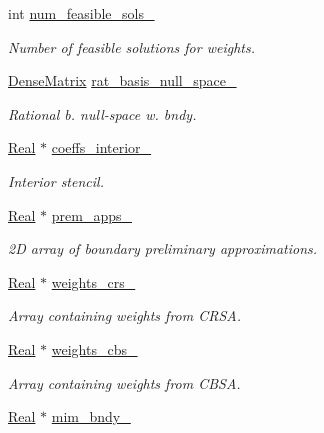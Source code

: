 \begin{DoxyCompactItemize}
int \hyperlink{classmtk_1_1Grad1D_a3561b0197c2b058bdbca39a656471299}{num\+\_\+feasible\+\_\+sols\+\_\+}
\begin{DoxyCompactList}\small\item\em Number of feasible solutions for weights. \end{DoxyCompactList}\item 
\hyperlink{classmtk_1_1DenseMatrix}{Dense\+Matrix} \hyperlink{classmtk_1_1Grad1D_a21a2941a03ae8fbf24d880660acf3db5}{rat\+\_\+basis\+\_\+null\+\_\+space\+\_\+}
\begin{DoxyCompactList}\small\item\em Rational b. null-\/space w. bndy. \end{DoxyCompactList}\item 
\hyperlink{group__c01-roots_gac080bbbf5cbb5502c9f00405f894857d}{Real} $\ast$ \hyperlink{classmtk_1_1Grad1D_a2395861161c26f237e892aacebcc1909}{coeffs\+\_\+interior\+\_\+}
\begin{DoxyCompactList}\small\item\em Interior stencil. \end{DoxyCompactList}\item 
\hyperlink{group__c01-roots_gac080bbbf5cbb5502c9f00405f894857d}{Real} $\ast$ \hyperlink{classmtk_1_1Grad1D_aee092221dd2a496e0d51883168035551}{prem\+\_\+apps\+\_\+}
\begin{DoxyCompactList}\small\item\em 2\+D array of boundary preliminary approximations. \end{DoxyCompactList}\item 
\hyperlink{group__c01-roots_gac080bbbf5cbb5502c9f00405f894857d}{Real} $\ast$ \hyperlink{classmtk_1_1Grad1D_a96914abea78528b32499963ce9bbe4a6}{weights\+\_\+crs\+\_\+}
\begin{DoxyCompactList}\small\item\em Array containing weights from C\+R\+S\+A. \end{DoxyCompactList}\item 
\hyperlink{group__c01-roots_gac080bbbf5cbb5502c9f00405f894857d}{Real} $\ast$ \hyperlink{classmtk_1_1Grad1D_ae6b0a908748923b2acd97e5bf7acc000}{weights\+\_\+cbs\+\_\+}
\begin{DoxyCompactList}\small\item\em Array containing weights from C\+B\+S\+A. \end{DoxyCompactList}\item 
\hyperlink{group__c01-roots_gac080bbbf5cbb5502c9f00405f894857d}{Real} $\ast$ \hyperlink{classmtk_1_1Grad1D_afcd61d362ba7b0f588645ab09c773432}{mim\+\_\+bndy\+\_\+}

\end{DoxyCompactItemize}
